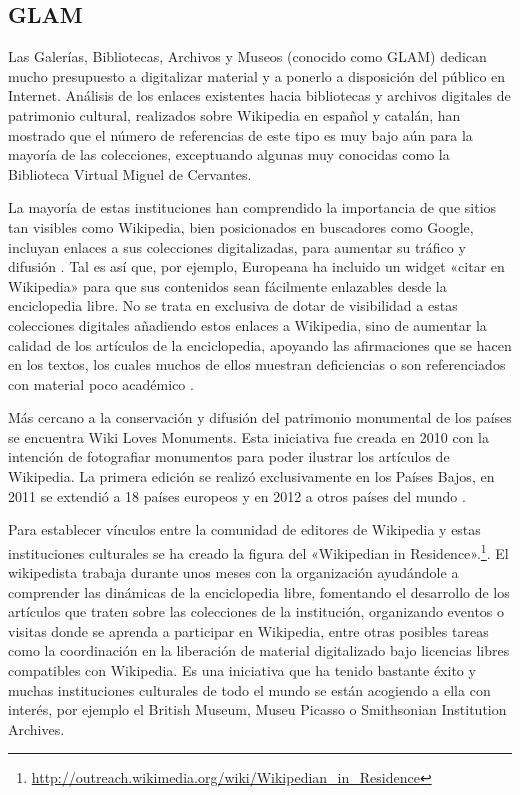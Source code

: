 \documentclass[11pt,onecolumn]{article}
\begin{document}
\subsection{GLAM}


Las Galerías, Bibliotecas, Archivos y Museos (conocido como GLAM) dedican mucho presupuesto a digitalizar material y a ponerlo a disposición del público en Internet. Análisis de los enlaces existentes hacia bibliotecas y archivos digitales de patrimonio cultural, realizados sobre Wikipedia en español y catalán, han mostrado que el número de referencias de este tipo es muy bajo aún para la mayoría de las colecciones, exceptuando algunas muy conocidas como la Biblioteca Virtual Miguel de Cervantes\citep{saorin2012}.

La mayoría de estas instituciones han comprendido la importancia de que sitios tan visibles como Wikipedia, bien posicionados en buscadores como Google, incluyan enlaces a sus colecciones digitalizadas, para aumentar su tráfico y difusión \citep{lally2007, elder2012}. Tal es así que, por ejemplo, Europeana ha incluido un widget «citar en Wikipedia» para que sus contenidos sean fácilmente enlazables desde la enciclopedia libre. No se trata en exclusiva de dotar de visibilidad a estas colecciones digitales añadiendo estos enlaces a Wikipedia, sino de aumentar la calidad de los artículos de la enciclopedia, apoyando las afirmaciones que se hacen en los textos, los cuales muchos de ellos muestran deficiencias o son referenciados con material poco académico \citep{nielsen2007, luyt2010}.


Más cercano a la conservación y difusión del patrimonio monumental de los países se encuentra Wiki Loves Monuments. Esta iniciativa fue creada en 2010 con la intención de fotografiar monumentos para poder ilustrar los artículos de Wikipedia. La primera edición se realizó exclusivamente en los Países Bajos, en 2011 se extendió a 18 países europeos y en 2012 a otros países del mundo \citep{rodriguez2012wlm}.



Para establecer vínculos entre la comunidad de editores de Wikipedia y estas instituciones culturales se ha creado la figura del «Wikipedian in Residence».\footnote{\href{http://outreach.wikimedia.org/wiki/Wikipedian_in_Residence}{http://outreach.wikimedia.org/wiki/Wikipedian\_in\_Residence}}. El wikipedista trabaja durante unos meses con la organización ayudándole a comprender las dinámicas de la enciclopedia libre, fomentando el desarrollo de los artículos que traten sobre las colecciones de la institución, organizando eventos o visitas donde se aprenda a participar en Wikipedia, entre otras posibles tareas como la coordinación en la liberación de material digitalizado bajo licencias libres compatibles con Wikipedia. Es una iniciativa que ha tenido bastante éxito y muchas instituciones culturales de todo el mundo se están acogiendo a ella con interés, por ejemplo el British Museum, Museu Picasso o Smithsonian Institution Archives.
\end{document}
